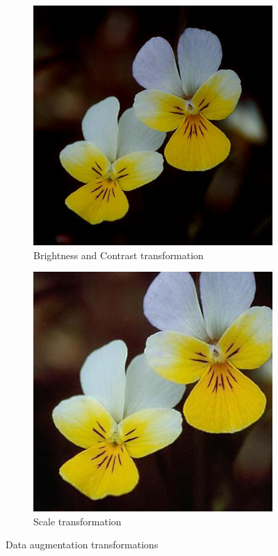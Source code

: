 \documentclass[11]{article}
\begin{document}
\begin{figure}[H]
    \begin{subfigure}[t]{0.45\textwidth}
    \centering
  \includegraphics[scale=0.25]{images/brightness.jpg}
    \caption{Brightness and Contrast transformation}
    \label{brightness}
    \end{subfigure}
    \begin{subfigure}[t]{0.45\textwidth}
    \centering
    \includegraphics[scale=0.31]{images/scale.jpg}
    \caption{Scale transformation}
    \label{scale}
    \end{subfigure}
    \label{transformations}
    \caption{Data augmentation transformations}
\end{figure}
\end{document}
